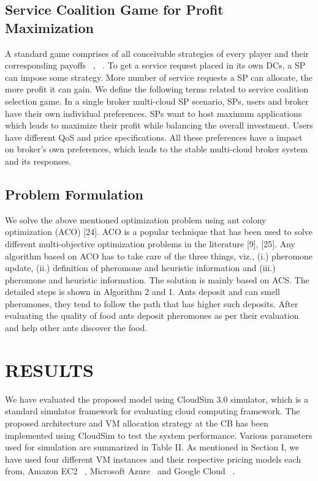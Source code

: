\documentclass[conference]{IEEEtran}
\newcommand\tab[1][0.8cm]{\hspace*{#1}}
\begin{document}
\subsection{Service Coalition Game for Profit Maximization}\label{AA}
A standard game comprises of all conceivable strategies of
every player and their corresponding payoffs ~\cite{b10}, ~\cite{b8}. To get
a service request placed in its own DCs, a SP can impose some
strategy. More number of service requests a SP can allocate,
the more profit it can gain. We define the following terms
related to service coalition selection game.
\newline
\tab In a single broker multi-cloud SP scenario, SPs, users and
broker have their own individual preferences. SPs want to
host maximum applications which leads to maximize their
profit while balancing the overall investment. Users have
different QoS and price specifications. All these preferences
have a impact on broker’s own preferences, which leads to
the stable multi-cloud broker system and its responses.

\subsection{Problem Formulation}
We solve the above mentioned optimization problem using ant colony optimization (ACO) [24]. ACO is a popular
technique that has been used to solve different multi-objective
optimization problems in the literature [9], [25]. Any algorithm
based on ACO has to take care of the three things, viz., (i.)
pheromone update, (ii.) definition of pheromone and heuristic
information and (iii.) pheromone and heuristic information.
The solution is mainly based on ACS. The detailed steps is
shown in Algorithm 2 and 1. Ants deposit and can smell
pheromones, they tend to follow the path that has higher
such deposits. After evaluating the quality of food ants deposit pheromones as per their evaluation and help other ants
discover the food.


\section{RESULTS}
We have evaluated the proposed model using CloudSim
3.0 simulator, which is a standard simulator framework for
evaluating cloud computing framework. The proposed architecture and VM allocation strategy at the CB has been
implemented using CloudSim to test the system performance.
Various parameters used for simulation are summarized in
Table II. As mentioned in Section I, we have used four different VM instances and their respective pricing models
each from, Amazon EC2 ~\cite{b5}, Microsoft Azure ~\cite{b6}and Google
Cloud ~\cite{b7}.
\end{document}
